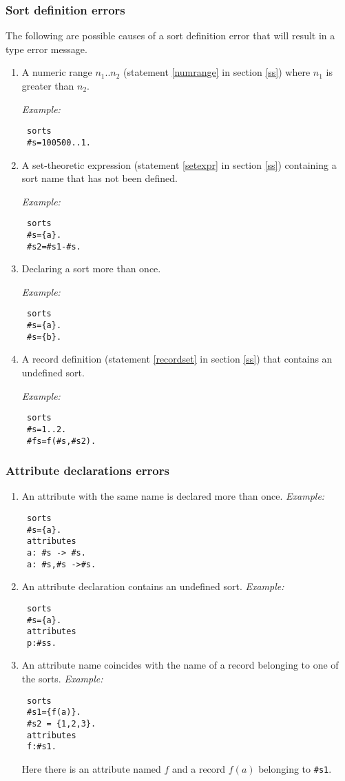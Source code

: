 \documentclass[12pt, letterpaper]{article}
\begin{document}
\subsubsection{Sort definition errors}
The following are possible causes of a sort definition error  that will result in a type error  message.
\begin{enumerate}
\item A numeric range $n_1..n_2$ (statement \ref{numrange} in section \ref{ss}) where  $n_1$ is greater than $n_2$.

\textit{Example:}
\begin{verbatim}
 sorts
 #s=100500..1.
\end{verbatim}


\item  A set-theoretic expression (statement \ref{setexpr} in section \ref{ss}) containing a sort name that has not been defined.

\textit{Example:}
\begin{verbatim}
 sorts
 #s={a}.
 #s2=#s1-#s.
\end{verbatim}

\item  Declaring a sort more than once.

\textit{Example:}
\begin{verbatim}
 sorts
 #s={a}.
 #s={b}.
\end{verbatim}

\item A record definition (statement \ref{recordset} in section \ref{ss}) that contains an undefined sort.

\textit{Example:}
\begin{verbatim}
 sorts
 #s=1..2.
 #fs=f(#s,#s2).
\end{verbatim}
\end{enumerate}
\subsubsection{Attribute declarations errors}

\begin{enumerate}
\item An attribute with the same name is declared more than once.
\textit{Example:}
\begin{verbatim}
 sorts
 #s={a}.
 attributes
 a: #s -> #s.
 a: #s,#s ->#s.
\end{verbatim}
\item An attribute declaration contains an undefined sort.
\textit{Example:}
\begin{verbatim}
 sorts
 #s={a}.
 attributes
 p:#ss.
\end{verbatim}

\item An attribute name coincides with the name of a record belonging to one of the sorts.
\textit{Example:}
\begin{verbatim}
 sorts
 #s1={f(a)}.
 #s2 = {1,2,3}.
 attributes
 f:#s1.
\end{verbatim}
Here there is an attribute named $f$ and a record $f(a)$ belonging to \texttt{\#s1}.
\end{enumerate}
\end{document}
